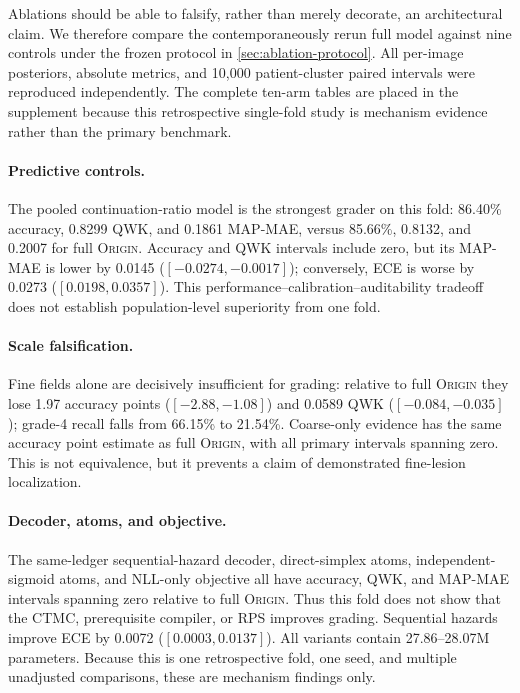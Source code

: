 \documentclass[10pt,twocolumn,letterpaper]{article}
\newcommand{\method}{\textsc{Origin}\xspace}
\begin{document}
Ablations should be able to falsify, rather than merely decorate, an
architectural claim.  We therefore compare the contemporaneously rerun full
model against nine controls under the frozen protocol in
\cref{sec:ablation-protocol}.  All per-image posteriors, absolute metrics, and
10,000 patient-cluster paired intervals were reproduced independently.  The
complete ten-arm tables are placed in the supplement because this retrospective
single-fold study is mechanism evidence rather than the primary benchmark.

\paragraph{Predictive controls.}
The pooled continuation-ratio model is the strongest grader on this fold:
86.40\% accuracy, 0.8299 QWK, and 0.1861 MAP-MAE, versus 85.66\%, 0.8132,
and 0.2007 for full \method.  Accuracy and QWK intervals include zero, but its
MAP-MAE is lower by 0.0145 ($[-0.0274,-0.0017]$); conversely, ECE is worse by
0.0273 ($[0.0198,0.0357]$).  This performance--calibration--auditability
tradeoff does not establish population-level superiority from one fold.

\paragraph{Scale falsification.}
Fine fields alone are decisively insufficient for grading: relative to full
\method they lose 1.97 accuracy points ($[-2.88,-1.08]$) and 0.0589 QWK
($[-0.084,-0.035]$); grade-4 recall falls from 66.15\% to 21.54\%.  Coarse-only
evidence has the same accuracy point estimate as full \method, with all primary
intervals spanning zero.  This is not equivalence, but it prevents a claim of
demonstrated fine-lesion localization.

\paragraph{Decoder, atoms, and objective.}
The same-ledger sequential-hazard decoder, direct-simplex atoms,
independent-sigmoid atoms, and NLL-only objective all have accuracy, QWK, and
MAP-MAE intervals spanning zero relative to full \method.  Thus this fold does
not show that the CTMC, prerequisite compiler, or RPS improves grading.
Sequential hazards improve ECE by 0.0072 ($[0.0003,0.0137]$).  All variants
contain 27.86--28.07M parameters.  Because this is one retrospective fold, one
seed, and multiple unadjusted comparisons, these are mechanism findings only.
\end{document}
